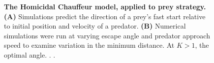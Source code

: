\documentclass[12pt]{article}
\begin{document}
\pagebreak




\pagebreak
\begin{figure}[t]
\begin{centering}
\centering	
\caption{\textbf{The Homicidal Chauffeur model, applied to prey strategy.} \textbf{(A)} Simulations predict the direction of a prey's fast start relative to initial position and velocity of a predator. \textbf{(B)} Numerical simulations were run at varying escape angle and predator approach speed to examine variation in the minimum distance. At $K>1$, the optimal angle. . .  }
\label{weihs_topo}
\end{centering}
\end{figure}

\pagebreak









\end{document}
